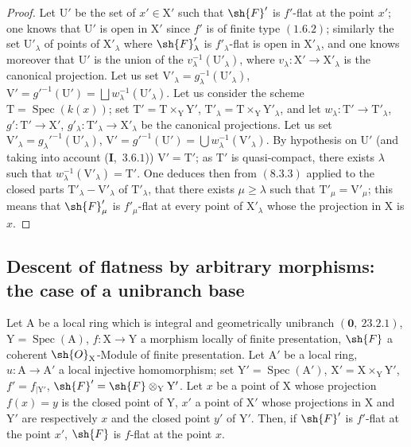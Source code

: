 \begin{proof}
Let $\mathrm{U}'$ be the set of $x'\in\mathrm{X}'$ such that $\sh{F}'$ is $f'$-flat at the point $x'$; one knows 
that $\mathrm{U}'$ is open in $\mathrm{X}'$ since $f'$ is of finite type $(1.6.2)$; similarly the
set $\mathrm{U}'_\lambda$ of points of $\mathrm{X}'_\lambda$ where $\sh{F}'_\lambda$ is $f'_\lambda$-flat is open in $\mathrm{X}'_\lambda$, and one knows moreover
 that $\mathrm{U}'$ is the union of the $v_\lambda^{-1}(\mathrm{U}'_\lambda)$, where $v_\lambda:\mathrm{X}'\to\mathrm{X}'_\lambda$ is the canonical projection. Let us set $\mathrm{V}'_\lambda=g_\lambda^{-1}(\mathrm{U}'_\lambda)$,
$\mathrm{V}'=g'^{-1}(\mathrm{U}')=\bigsqcup w_\lambda^{-1}(\mathrm{U}'_\lambda)$.
Let us consider the scheme $\mathrm{T}=\operatorname{Spec}(k(x))$; set $\mathrm{T}'=\mathrm{T}\times_\mathrm{Y}\mathrm{Y}'$, $\mathrm{T}'_\lambda=\mathrm{T}\times_\mathrm{Y}\mathrm{Y}'_\lambda$, and let
$w_\lambda:\mathrm{T}'\to\mathrm{T}'_\lambda$, $g':\mathrm{T}'\to\mathrm{X}'$, $g'_\lambda:\mathrm{T}'_\lambda\to\mathrm{X}'_\lambda$ be the canonical projections. Let us set $\mathrm{V}'_\lambda=g_\lambda'^{-1}(\mathrm{U}'_\lambda)$,
$\mathrm{V}'=g'^{-1}(\mathrm{U}')=\bigcup w_\lambda^{-1}(\mathrm{V}'_\lambda)$. By hypothesis on $\mathrm{U}'$ (and taking into account (\textbf{I},~$3.6.1$)) $\mathrm{V}'=\mathrm{T}'$;
as $\mathrm{T}'$ is quasi-compact, there exists $\lambda$ such that $w_\lambda^{-1}(\mathrm{V}'_\lambda)=\mathrm{T}'$. One deduces then from $(8.3.3)$
applied to the closed parts $\mathrm{T}'_\lambda-\mathrm{V}'_\lambda$ of $\mathrm{T}'_\lambda$, that there exists $\mu\geq\lambda$ such
that $\mathrm{T}'_\mu=\mathrm{V}'_\mu$; this means that $\sh{F}'_\mu$ is $f'_\mu$-flat at every point of $\mathrm{X}'_\lambda$ whose the projection
in $\mathrm{X}$ is $x$.
\end{proof}

\subsection{Descent of flatness by arbitrary morphisms: the case of a unibranch base}
\label{subsection:IV.11.6}

\begin{theorem}[11.6.1]
\label{IV.11.6.1}
Let $\mathrm{A}$ be a local ring which is integral and geometrically unibranch
$(\mathbf{0},~23.2.1)$, $\mathrm{Y}=\operatorname{Spec}(\mathrm{A})$, $f:\mathrm{X}\to\mathrm{Y}$ a morphism locally of finite presentation, $\sh{F}$ a
coherent $\sh{O}_\mathrm{X}$-Module of finite presentation. Let $\mathrm{A}'$ be a local ring, $u:\mathrm{A}\to\mathrm{A}'$ a local
injective homomorphism; set $\mathrm{Y}'=\operatorname{Spec}(\mathrm{A}')$, $\mathrm{X}'=\mathrm{X}\times_\mathrm{Y}\mathrm{Y}'$, $f'=f_{|\mathrm{Y}'}$, $\sh{F}'=\sh{F}\otimes_\mathrm{Y}\mathrm{Y}'$. Let $x$ be
a point of $\mathrm{X}$ whose projection $f(x)=y$ is the closed point of $\mathrm{Y}$, $x'$ a point of $\mathrm{X}'$ whose projections
in $\mathrm{X}$ and $\mathrm{Y}'$ are respectively $x$ and the closed point $y'$ of $\mathrm{Y}'$. Then, if $\sh{F}'$ is $f'$-flat at the point $x'$,
$\sh{F}$ is $f$-flat at the point $x$.
\end{theorem}


